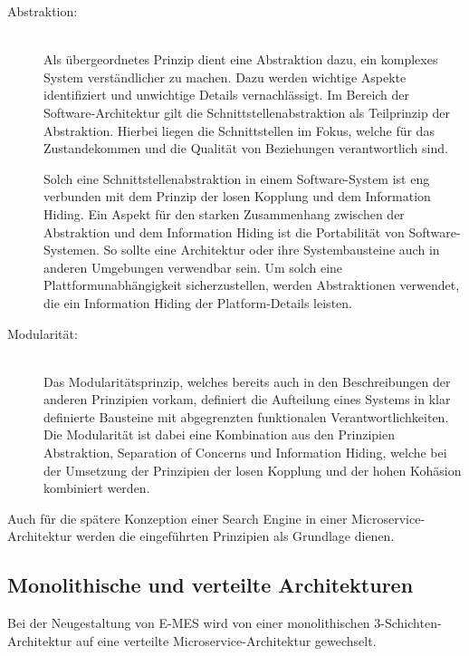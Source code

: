 \begin{description}
    \item[Abstraktion:]\hfill \\
    Als übergeordnetes Prinzip dient eine Abstraktion dazu, ein komplexes System verständlicher zu machen. Dazu werden wichtige Aspekte identifiziert und unwichtige Details vernachlässigt. Im Bereich der Software-Architektur gilt die Schnittstellenabstraktion als Teilprinzip der Abstraktion. Hierbei liegen die Schnittstellen im Fokus, welche für das Zustandekommen und die Qualität von Beziehungen verantwortlich sind.

    Solch eine Schnittstellenabstraktion in einem Software-System ist eng verbunden mit dem Prinzip der losen Kopplung und dem Information Hiding. Ein Aspekt für den starken Zusammenhang zwischen der Abstraktion und dem Information Hiding ist die Portabilität von Software-Systemen. So sollte eine Architektur oder ihre Systembausteine auch in anderen Umgebungen verwendbar sein. Um solch eine Plattformunabhängigkeit sicherzustellen, werden Abstraktionen verwendet, die ein Information Hiding der Platform-Details leisten.

    \item[Modularität:]\hfill \\
    Das Modularitätsprinzip, welches bereits auch in den Beschreibungen der anderen Prinzipien vorkam, definiert die Aufteilung eines Systems in klar definierte Bausteine mit abgegrenzten funktionalen Verantwortlichkeiten. Die Modularität ist dabei eine Kombination aus den Prinzipien Abstraktion, Separation of Concerns und Information Hiding, welche bei der Umsetzung der Prinzipien der losen Kopplung und der hohen Kohäsion kombiniert werden.

\end{description}

Auch für die spätere Konzeption einer Search Engine in einer Microservice-Architektur werden die eingeführten Prinzipien als Grundlage dienen.

\subsection{Monolithische und verteilte Architekturen\label{subsec2.1.2:Unterunterpunkt-2}}

Bei der Neugestaltung von E-MES wird von einer monolithischen 3-Schichten-Architektur auf eine verteilte Microservice-Architektur gewechselt.

